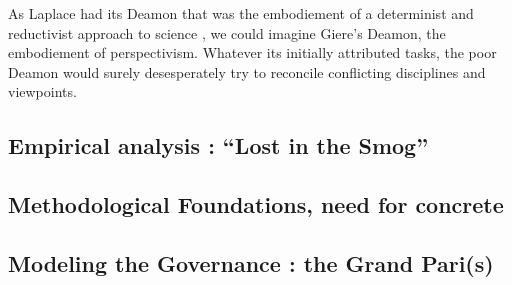 

As Laplace had its Deamon that was the embodiement of a determinist and reductivist approach to science
, we could imagine Giere's Deamon, the embodiement of perspectivism. Whatever its initially attributed tasks, the poor Deamon would surely desesperately try to reconcile conflicting disciplines and viewpoints.




\subsection{Empirical analysis : ``Lost in the Smog''}








\subsection{Methodological Foundations, need for concrete}







\subsection{Modeling the Governance : the Grand Pari(s)}




